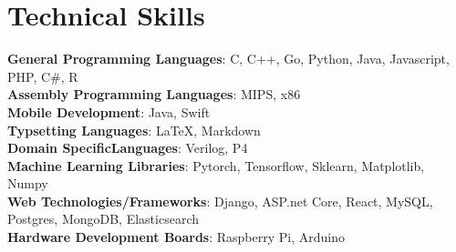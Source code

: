 \section{Technical Skills}
\begin{itemize}[leftmargin=0.15in, label={}]
    \small{\item{
            \textbf{General Programming Languages}{: C, C++, Go, Python, Java, Javascript, PHP, C\#, R} \\
                \textbf{Assembly Programming Languages}{: MIPS, x86} \\
                \textbf{Mobile Development}{: Java, Swift} \\
                \textbf{Typsetting Languages}{: LaTeX, Markdown} \\
                \textbf{Domain SpecificLanguages}{: Verilog, P4} \\
                 \textbf{Machine Learning Libraries}{: Pytorch, Tensorflow, Sklearn, Matplotlib, Numpy}\\
            \textbf{Web Technologies/Frameworks}{: Django, ASP.net Core, React, MySQL, Postgres, MongoDB, Elasticsearch} \\
            \textbf{Hardware Development Boards}{: Raspberry Pi, Arduino}
    }}
\end{itemize}

